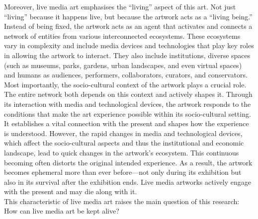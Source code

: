 Moreover, live media art emphasises the ``living'' aspect of this art. Not just ``living'' because it happens live, but because the artwork acts as a ``living being.'' Instead of being fixed, the artwork acts as an agent that activates and connects a network of entities from various interconnected ecosystems. These ecosystems vary in complexity and include media devices and technologies that play key roles in allowing the artwork to interact. They also include institutions, diverse spaces (such as museums, parks, gardens, urban landscapes, and even virtual spaces) and humans as audiences, performers, collaborators, curators, and conservators. Most importantly, the socio-cultural context of the artwork plays a crucial role. The entire network both depends on this context and actively shapes it. Through its interaction with media and technological devices, the artwork responds to the conditions that make the art experience possible within its socio-cultural setting. It establishes a vital connection with the present and shapes how the experience is understood. However, the rapid changes in media and technological devices, which affect the socio-cultural aspects and thus the institutional and economic landscape, lead to quick changes in the artwork’s ecosystem. This continuous becoming often distorts the original intended experience. As a result, the artwork becomes ephemeral more than ever before—not only during its exhibition but also in its survival after the exhibition ends. Live media artworks actively engage with the present and may die along with it.\\
This characteristic of live media art raises the main question of this research: How can live media art be kept alive?\\
